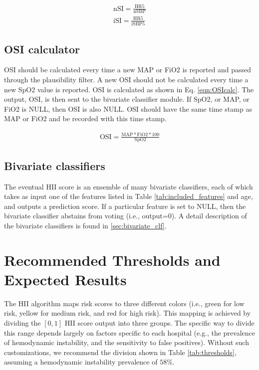 \documentclass[
   technote
]{phildoc}
\newcommand{\ie}{i.e.,}
\newcommand{\eg}{e.g.,}
\newcommand{\hii}{HII}
\newcommand{\tab}{Table}
\newcommand{\eq}{Eq.}
\begin{document}
\begin{eqnarray}
\text{nSI} = \frac{\text{HR5}}{\text{nSBP}} \label{eqn:nSIcalc}\\
\text{iSI} = \frac{\text{HR5}}{\text{iSBP5}} \label{eqn:iSIcalc}
\end{eqnarray}


\subsection{OSI calculator} 
OSI should be calculated every time a new MAP or FiO2 is reported and passed through the plausibility filter. A new OSI should not be calculated every time a new SpO2 value is reported. OSI is calculated as shown in \eq{} \ref{eqn:OSIcalc}. The output, OSI, is then sent to the bivariate classifier module. If SpO2, or MAP, or FiO2 is NULL, then OSI is also NULL. OSI should have the same time stamp as MAP or FiO2 and be recorded with this time stamp.

\begin{eqnarray}
\text{OSI} = \frac{\text{MAP}*\text{FiO2}*100}{\text{SpO2}} \label{eqn:OSIcalc}
\end{eqnarray}

\subsection{Bivariate classifiers}
The eventual \hii{} score is an ensemble of many bivariate classifiers, each of which takes as input one of the features listed in \tab{} \ref{tab:included_features} and age, and outputs a prediction score. If a particular feature is set to NULL, then the bivariate classifier abstains from voting (\ie{} output=0). A detail description of the bivariate classifiers is found in \ref{sec:bivariate_clf}. 
 
\section{Recommended Thresholds and Expected Results}
The \hii{} algorithm maps risk scores to three different colors (\ie{} green for low risk, yellow for medium risk, and red for high risk). This mapping is achieved by dividing the $[0,1]$ HII score output into three groups. The specific way to divide this range depends largely on factors specific to each hospital (\eg{} the prevalence of hemodynamic instability, and the sensitivity to false positives). Without such customizations, we recommend the division shown in \tab{} \ref{tab:thresholds}, assuming a hemodynamic instability prevalence of $58 \%$. 
\end{document}
